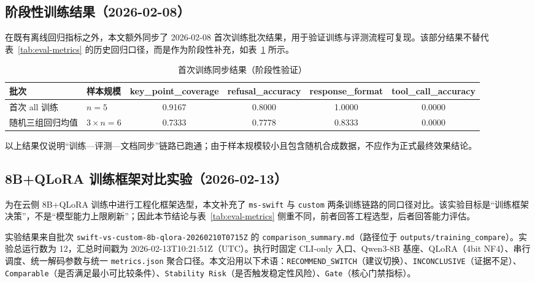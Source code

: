 \subsection{阶段性训练结果（2026-02-08）}
在既有离线回归指标之外，本文额外同步了 2026-02-08 首次训练批次结果，用于验证训练与评测流程可复现。该部分结果不替代表~\ref{tab:eval-metrics} 的历史回归口径，而是作为阶段性补充，如表~\ref{tab:first-train-20260208} 所示。

\begin{table}[htbp]
  \centering
  \caption{首次训练同步结果（阶段性验证）}
  \label{tab:first-train-20260208}
  \begin{tabular}{lp{2.2cm}cccc}
    \toprule
    批次 & 样本规模 & key\_point\_coverage & refusal\_accuracy & response\_format & tool\_call\_accuracy \\
    \midrule
    首次 all 训练 & $n=5$ & 0.9167 & 0.8000 & 1.0000 & 0.0000 \\
    随机三组回归均值 & $3 \times n=6$ & 0.7333 & 0.7778 & 0.8333 & 0.0000 \\
    \bottomrule
  \end{tabular}
\end{table}

以上结果仅说明“训练—评测—文档同步”链路已跑通；由于样本规模较小且包含随机合成数据，不应作为正式最终效果结论。

\subsection{8B+QLoRA 训练框架对比实验（2026-02-13）}
为在云侧 8B+QLoRA 训练中进行工程化框架选型，本文补充了 \texttt{ms-swift} 与 \texttt{custom} 两条训练链路的同口径对比。该实验目标是“训练框架决策”，不是“模型能力上限刷新”；因此本节结论与表~\ref{tab:eval-metrics} 侧重不同，前者回答工程选型，后者回答能力评估。

实验结果来自批次 \texttt{swift-vs-custom-8b-qlora-20260210T0715Z} 的 \texttt{comparison\_summary.md}（路径位于 \texttt{outputs/training\_compare}）。实验总运行数为 12，汇总时间戳为 2026-02-13T10:21:51Z（UTC）。执行时固定 CLI-only 入口、Qwen3-8B 基座、QLoRA（4bit NF4）、串行调度、统一解码参数与统一 \texttt{metrics.json} 聚合口径。本文沿用以下术语：\texttt{RECOMMEND\_SWITCH}（建议切换）、\texttt{INCONCLUSIVE}（证据不足）、\texttt{Comparable}（是否满足最小可比较条件）、\texttt{Stability Risk}（是否触发稳定性风险）、\texttt{Gate}（核心门禁指标）。

